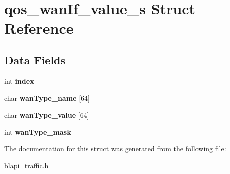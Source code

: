 \hypertarget{structqos__wanIf__value__s}{}\section{qos\+\_\+wan\+If\+\_\+value\+\_\+s Struct Reference}
\label{structqos__wanIf__value__s}
\subsection*{Data Fields}
\begin{DoxyCompactItemize}
\item 
\mbox{\label{structqos__wanIf__value__s_ab21e634b8456ab0766839c1fe0773485}} 
int {\bfseries index}
\item 
\mbox{\label{structqos__wanIf__value__s_ae9df4bfcfe2a7809abf3db1fbffe2300}} 
char {\bfseries wan\+Type\+\_\+name} \mbox{[}64\mbox{]}
\item 
\mbox{\label{structqos__wanIf__value__s_a94b9c8164e08b5f909f5317be34ead00}} 
char {\bfseries wan\+Type\+\_\+value} \mbox{[}64\mbox{]}
\item 
\mbox{\label{structqos__wanIf__value__s_a58df258ac9b1ddab1604905b2e5a7dcd}} 
int {\bfseries wan\+Type\+\_\+mask}
\end{DoxyCompactItemize}


The documentation for this struct was generated from the following file\+:\begin{DoxyCompactItemize}
\item 
\hyperlink{blapi__traffic_8h}{blapi\+\_\+traffic.\+h}\end{DoxyCompactItemize}
